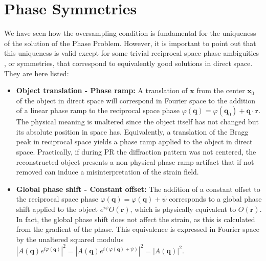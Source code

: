 \section{Phase Symmetries}\label{sec:phase_symm}
We have seen how the oversampling condition is fundamental for the uniqueness of the solution of the Phase Problem. 
However, it is important to point out that this uniqueness is valid except for some trivial reciprocal space phase ambiguities 
\cite{fienup_phase_1982,Millane1990}, or symmetries, that correspond to equivalently good solutions in direct space. They are here listed: 
\begin{itemize}

    \item \textbf{Object translation - Phase ramp:} A translation of $\mathbf{x} $ from the center $\mathbf{x}_0$ 
    of the object in direct space will correspond in Fourier space to the addition of a linear phase ramp to the reciprocal 
    space phase $\varphi(\mathbf{q}) = \varphi(\mathbf{q}_0) + \mathbf{q} \cdot \mathbf{r}$. The physical meaning is unaltered 
    since the object itself has not changed but its absolute position in space has. Equivalently, a translation of the Bragg peak in reciprocal 
    space yields a phase ramp applied to the object in direct space. Practically, if 
    during PR the diffraction pattern was not centered, the reconstructed object presents a non-physical phase ramp artifact 
    that if not removed can induce a misinterpretation of the strain field. 

    \item \textbf{Global phase shift - Constant offset:} The addition of a constant offset to the reciprocal space phase 
    $\varphi(\mathbf{q}) = \varphi(\mathbf{q}) + \psi$ corresponds to a global phase shift applied to the object $e^{i\psi}O(\mathbf{r})$, 
    which is physically equivalent to $O(\mathbf{r})$. 
    In fact, the global phase shift does not affect the strain, as this is calculated from the gradient of the phase. 
    This equivalence is expressed in Fourier space by the unaltered squared modulus 
    $|A(\mathbf{q})e^{i\varphi(\mathbf{q})}|^2 = |A(\mathbf{q})e^{i(\varphi(\mathbf{q}) + \psi)}|^2 = |A(\mathbf{q})|^2 $.
    

\end{itemize}
